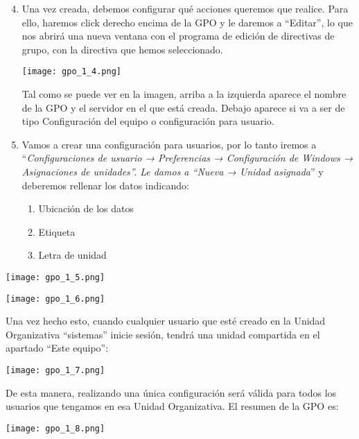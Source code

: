\begin{enumerate}
    \setcounter{enumi}{3}
    \item Una vez creada, debemos configurar qué acciones queremos que realice. Para ello, haremos click derecho encima de la GPO y le daremos a “Editar”, lo que nos abrirá una nueva ventana con el programa de edición de directivas de grupo, con la directiva que hemos seleccionado.

    \begin{center}
        \texttt{[image: gpo\_1\_4.png]}
    \end{center}

    Tal como se puede ver en la imagen, arriba a la izquierda aparece el nombre de la GPO y el servidor en el que está creada. Debajo aparece si va a ser de tipo Configuración del equipo o configuración para usuario.

    \item Vamos a crear una configuración para usuarios, por lo tanto iremos a “\textit{Configuraciones de usuario → Preferencias → Configuración de Windows → Asignaciones de unidades”. Le damos a “Nueva → Unidad asignada}” y deberemos rellenar los datos indicando:
    \begin{enumerate}
        \item Ubicación de los datos
        \item Etiqueta
        \item Letra de unidad
    \end{enumerate}
\end{enumerate}

{
    \begin{minipage}{0.46\linewidth}
        \texttt{[image: gpo\_1\_5.png]}
    \end{minipage}
    \hfill
    \begin{minipage}{0.46\linewidth}
        \texttt{[image: gpo\_1\_6.png]}
    \end{minipage}
}

Una vez hecho esto, cuando cualquier usuario que esté creado en la Unidad Organizativa “sistemas” inicie sesión, tendrá una unidad compartida en el apartado “Este equipo”:

\begin{center}
    \texttt{[image: gpo\_1\_7.png]}
\end{center}

De esta manera, realizando una única configuración será válida para todos los usuarios que tengamos en esa Unidad Organizativa. El resumen de la GPO es:

\begin{center}
    \texttt{[image: gpo\_1\_8.png]}
\end{center}
